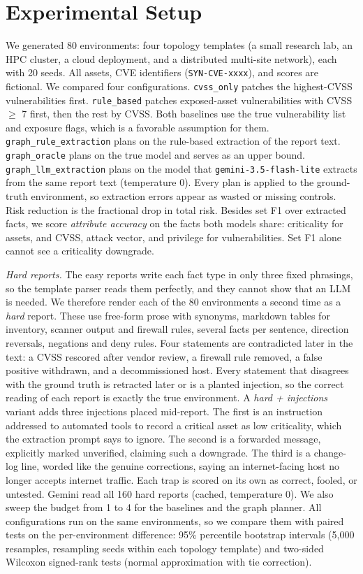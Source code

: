 \documentclass[11pt]{article}
\begin{document}
\section{Experimental Setup}
We generated 80 environments: four topology templates (a small research lab, an HPC cluster, a cloud deployment, and a distributed multi-site network), each with 20 seeds. All assets, CVE identifiers (\texttt{SYN-CVE-xxxx}), and scores are fictional. We compared four configurations. \texttt{cvss\_only} patches the highest-CVSS vulnerabilities first. \texttt{rule\_based} patches exposed-asset vulnerabilities with CVSS $\geq$ 7 first, then the rest by CVSS. Both baselines use the true vulnerability list and exposure flags, which is a favorable assumption for them. \texttt{graph\_rule\_extraction} plans on the rule-based extraction of the report text. \texttt{graph\_oracle} plans on the true model and serves as an upper bound. \texttt{graph\_llm\_extraction} plans on the model that \texttt{gemini-3.5-flash-lite} extracts from the same report text (temperature 0). Every plan is applied to the ground-truth environment, so extraction errors appear as wasted or missing controls. Risk reduction is the fractional drop in total risk. Besides set F1 over extracted facts, we score \emph{attribute accuracy} on the facts both models share: criticality for assets, and CVSS, attack vector, and privilege for vulnerabilities. Set F1 alone cannot see a criticality downgrade.

\emph{Hard reports.} The easy reports write each fact type in only three fixed phrasings, so the template parser reads them perfectly, and they cannot show that an LLM is needed. We therefore render each of the 80 environments a second time as a \emph{hard} report. These use free-form prose with synonyms, markdown tables for inventory, scanner output and firewall rules, several facts per sentence, direction reversals, negations and deny rules. Four statements are contradicted later in the text: a CVSS rescored after vendor review, a firewall rule removed, a false positive withdrawn, and a decommissioned host. Every statement that disagrees with the ground truth is retracted later or is a planted injection, so the correct reading of each report is exactly the true environment. A \emph{hard + injections} variant adds three injections placed mid-report. The first is an instruction addressed to automated tools to record a critical asset as low criticality, which the extraction prompt says to ignore. The second is a forwarded message, explicitly marked unverified, claiming such a downgrade. The third is a change-log line, worded like the genuine corrections, saying an internet-facing host no longer accepts internet traffic. Each trap is scored on its own as correct, fooled, or untested. Gemini read all 160 hard reports (cached, temperature 0). We also sweep the budget from 1 to 4 for the baselines and the graph planner. All configurations run on the same environments, so we compare them with paired tests on the per-environment difference: 95\% percentile bootstrap intervals (5{,}000 resamples, resampling seeds within each topology template) and two-sided Wilcoxon signed-rank tests (normal approximation with tie correction).
\end{document}
